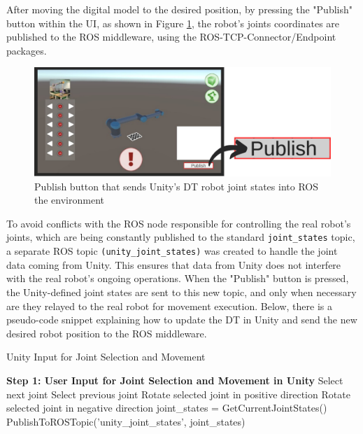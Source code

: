     After moving the digital model to the desired position, by pressing the "Publish" button within the \ac{UI}, as shown in Figure \ref{fig:publish_UI_button}, the robot's joints coordinates are published to the \ac{ROS} middleware, using the \ac{ROS}-\ac{TCP}-Connector/Endpoint packages.
    

    \begin{figure}[htpb]
        \centering
        \includegraphics[width=\linewidth]{figs/publish-button.png}
        \caption{Publish button that sends Unity's \ac{DT} robot joint states into ROS the environment}
        \label{fig:publish_UI_button}
    \end{figure}

    To avoid conflicts with the \ac{ROS} node responsible for controlling the real robot's joints, which are being constantly published to the standard \texttt{joint\_states} topic, a separate \ac{ROS} topic \texttt{(unity\_joint\_states)} was created to handle the joint data coming from Unity. This ensures that data from Unity does not interfere with the real robot’s ongoing operations. When the "Publish" button is pressed, the Unity-defined joint states are sent to this new topic, and only when necessary are they relayed to the real robot for movement execution. Below, there is a pseudo-code snippet explaining how to update the \ac{DT} in Unity and send the new desired robot position to the \ac{ROS} middleware.

    \begin{algorithm}
        \caption{Unity Input for Joint Selection and Movement}\label{alg:unity_input}
        \begin{algorithmic}[1]
            \State \textbf{Step 1: User Input for Joint Selection and Movement in Unity}
                    \State Select next joint
                    \State Select previous joint
                \EndIf
                    \State Rotate selected joint in positive direction
                    \State Rotate selected joint in negative direction
                \EndIf
                    \State joint\_states = GetCurrentJointStates()
                    \State PublishToROSTopic('unity\_joint\_states', joint\_states)
                \EndIf
            \EndWhile
        \end{algorithmic}
    \end{algorithm}

